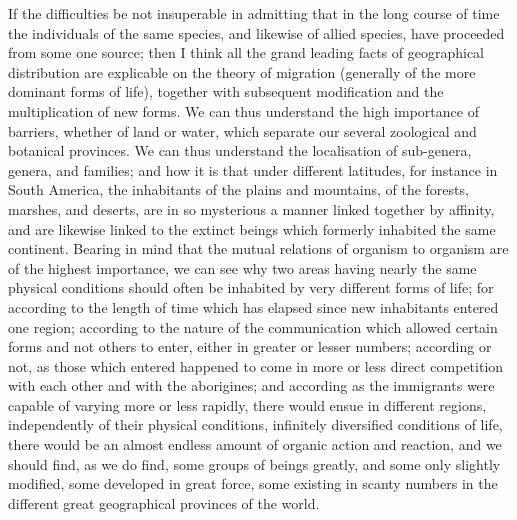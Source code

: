 \indent If the difficulties be not insuperable in admitting that in the long course of time the individuals of the same species, and likewise of allied species, have proceeded from some one source; then I think all the grand leading facts of geographical distribution are explicable on the theory of migration (generally of the more dominant forms of life), together with subsequent modification and the multiplication of new forms. We can thus understand the high importance of barriers, whether of land or water, which separate our several zoological and botanical provinces.  We can thus understand the localisation of sub-genera, genera, and families; and how it is that under different latitudes, for instance in South America, the inhabitants of the plains and mountains, of the forests, marshes, and deserts, are in so mysterious a manner linked together by affinity, and are likewise linked to the extinct beings which formerly inhabited the same continent. Bearing in mind that the mutual relations of organism to organism are of the highest importance, we can see why two areas having nearly the same physical conditions should often be inhabited by very different forms of life; for according to the length of time which has elapsed since new inhabitants entered one region; according to the nature of the communication which allowed certain forms and not others to enter, either in greater or lesser numbers; according or not, as those which entered happened to come in more or less direct competition with each other and with the aborigines; and according as the immigrants were capable of varying more or less rapidly, there would ensue in different regions, independently of their physical conditions, infinitely diversified conditions of life, there would be an almost endless amount of organic action and reaction, and we should find, as we do find, some groups of beings greatly, and some only slightly modified, some developed in great force, some existing in scanty numbers in the different great geographical provinces of the world.~\\
